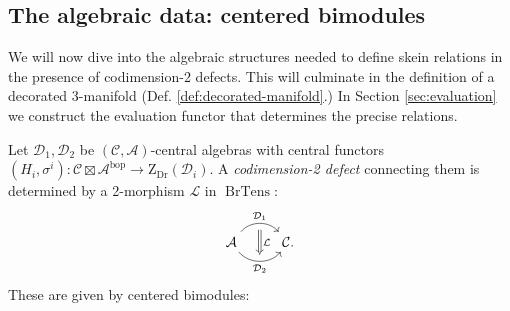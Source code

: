 \documentclass[a4paper]{article}
\numberwithin{equation}{section}
\newcommand{\1}{{\mathrm{1}\mkern-4mu{\mathchoice{}{}{\mskip-0.5mu}{\mskip-1mu}}\mathrm{l}}}
\newcommand{\A}{\mathcal{A}}
\newcommand{\C}{\mathcal{C}}
\newcommand{\D}{\mathcal{D}}
\renewcommand{\L}{\mathcal{L}}
\newcommand{\bop}{\text{bop}}
\newcommand{\Zdr}{\mathrm{Z}_{\text{Dr}}}
\DeclareMathOperator{\BrTens}{BrTens}
\begin{document}
\subsection{The algebraic data: centered bimodules}\label{sec:centered-bimod}

We will now dive into the algebraic structures needed to define skein relations in the presence of codimension-2 defects. 
This will culminate in the definition of a decorated 3-manifold (Def. \ref{def:decorated-manifold}.)
In Section \ref{sec:evaluation} we construct the evaluation functor that determines the precise relations.

Let $\D_1,\D_2$ be $(\C,\A)$-central algebras with central functors $(H_i,\sigma^i) : \C\boxtimes\A^{\bop} \to \Zdr(\D_i)$.
A \emph{codimension-2 defect} connecting them is determined by a 2-morphism $\L$ in $\BrTens$:
\begin{equation}
    \begin{tikzcd}
\A \arrow[r, bend left=50, ""{name=U,below},"\D_1"{above}]
\arrow[r, bend right=50, "\D_2"{below}, ""{name=D}]
& \C.
\arrow[Rightarrow, from=U, to=D,"\L"]
\end{tikzcd}
\end{equation}
These are given by centered bimodules:
\end{document}

